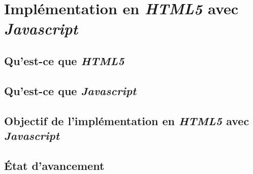 \section{Implémentation en \emph{HTML5} avec \emph{Javascript}}
  \subsection{Qu'est-ce que \emph{HTML5}}
  \subsection{Qu'est-ce que \emph{Javascript}}
  \subsection{Objectif de l'implémentation en \emph{HTML5} avec
              \emph{Javascript}}
  \subsection{État d'avancement}

